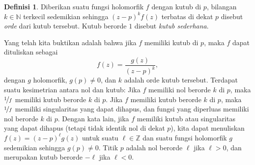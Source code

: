 \documentclass[12pt,openany]{book}
\newcommand{\Z}{{\mathbb{Z}}}
\newcommand{\N}{{\mathbb{N}}}
\newcommand{\myindex}[1]{#1\index{#1}}
\theoremstyle{plain}
\theoremstyle{remark}
\theoremstyle{definition}
\newtheorem{defn}[thm]{Definisi}
\theoremstyle{exercise}
\theoremstyle{example}
\begin{document}
\begin{defn}
Diberikan suatu fungsi holomorfik $f$ dengan kutub di $p$, bilangan $k \in \N$ terkecil
sedemikian sehingga ${(z-p)}^k f(z)$ terbatas di dekat $p$ disebut
\emph{orde} dari kutub tersebut.
Kutub berorde $1$ disebut \emph{\myindex{kutub sederhana}}.
\end{defn}

Yang telah kita buktikan adalah bahwa jika $f$
memiliki kutub di $p$, maka $f$ dapat dituliskan sebagai
\begin{equation*}
f(z) = \frac{g(z)}{{(z-p)}^k} ,
\end{equation*}
dengan $g$ holomorfik, $g(p) \neq 0$, dan $k$ adalah orde kutub tersebut.
Terdapat suatu kesimetrian antara nol dan kutub:
Jika $f$ memiliki nol berorde $k$ di $p$, maka $\nicefrac{1}{f}$ memiliki kutub
berorde $k$ di $p$.
Jika $f$ memiliki kutub berorde $k$ di $p$, maka $\nicefrac{1}{f}$
memiliki singularitas yang dapat dihapus, dan fungsi yang diperluas memiliki nol berorde
$k$ di $p$.
Dengan kata lain, jika $f$ memiliki kutub atau singularitas yang dapat dihapus (tetapi tidak
identik nol di dekat $p$), kita dapat menuliskan
$f(z) = {(z-p)}^\ell g(z)$ untuk suatu $\ell \in \Z$ dan suatu fungsi holomorfik $g$ sedemikian
sehingga $g(p) \neq 0$.
Titik $p$ adalah nol berorde $\ell$ jika $\ell
> 0$, dan merupakan kutub berorde $-\ell$ jika $\ell < 0$.
\end{document}
